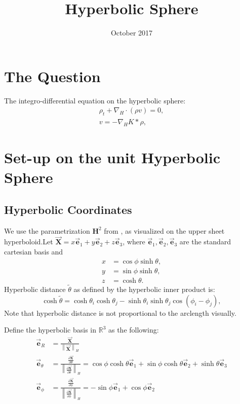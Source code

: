 \documentclass{article}
\title{Hyperbolic Sphere} %
\date{October 2017}
\author{} %
\newcommand{\p}{\partial}
\newcommand{\h}{\theta}
\newcommand{\ei}{\vec{\mathbf{e}}_1}
\newcommand{\ej}{\vec{\mathbf{e}}_2}
\newcommand{\ek}{\vec{\mathbf{e}}_3}
\newcommand{\er}{\vec{\mathbf{e}}_R}
\newcommand{\eh}{\vec{\mathbf{e}}_\theta}
\newcommand{\ep}{\vec{\mathbf{e}}_\phi}
\newcommand{\X}{\vec{\mathbf{X}}}
\newcommand{\R}{\mathbb{R}}
\newcommand{\norm}[1]{\left\lVert#1\right\rVert}
\newcommand{\eq}[1]{\begin{align}#1\end{align}}
\begin{document}
\maketitle
\section{The Question}

The integro-differential equation on the hyperbolic sphere:
\eq{
\rho_t + \nabla_H \cdot (\rho v) =  0, \\
v = -\nabla_H K * \rho, \label{velocity}
}

\section{Set-up on the unit Hyperbolic Sphere}
\subsection{Hyperbolic Coordinates}
We use the parametrization $\mathbf{H}^2$ from \cite{kimura}, as visualized on the upper sheet hyperboloid.Let $\X = x\ei + y\ej + z\ek$, where $\ei,\ej,\ek$ are the standard cartesian basis and
\begin{align*}
x &= \cos{\phi} \sinh{\h}, \\
y &= \sin{\phi} \sinh{\h}, \\
z &= \cosh{\h}.
\end{align*}
Hyperbolic distance $\tilde{\h}$ as defined by the hyperbolic inner product is:
\[
\cosh{\tilde{\h}} =  \cosh{\h_i}\cosh{\h_j} - \sinh{\h_i}\sinh{\h_j}\cos{(\phi_i - \phi_j)},
\]
Note that hyperbolic distance is not proportional to the arclength visually.

Define the hyperbolic basis in $\R^3$ as the following:
\begin{align*}
\er &= \frac{\X}{\norm{\X}_H} \\
\eh &= \frac{\frac{\p \X}{\p \h}}{\norm{\frac{\p \X}{\p \h}}_H } = \cos{\phi}\cosh{\h} \ei + \sin{\phi}\cosh{\h} \ej + \sinh{\h}\ek \\
\ep &= \frac{\frac{\p \X}{\p \phi}}{\norm{\frac{\p \X}{\p \phi}}_H } = -\sin{\phi}\ei + \cos{\phi}\ej
\end{align*}
\end{document}
